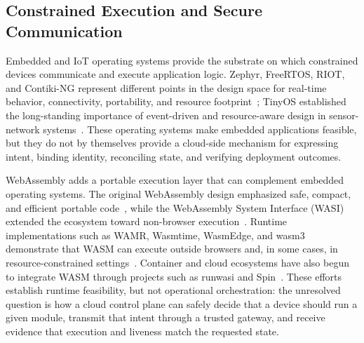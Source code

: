 
\subsection{Constrained Execution and Secure Communication}
Embedded and IoT operating systems provide the substrate on which constrained devices communicate and execute application logic. Zephyr, FreeRTOS, RIOT, and Contiki-NG represent different points in the design space for real-time behavior, connectivity, portability, and resource footprint~\cite{zephyr,freertos,riot,contiki}; TinyOS established the long-standing importance of event-driven and resource-aware design in sensor-network systems~\cite{tinyos}. These operating systems make embedded applications feasible, but they do not by themselves provide a cloud-side mechanism for expressing intent, binding identity, reconciling state, and verifying deployment outcomes.

WebAssembly adds a portable execution layer that can complement embedded operating systems. The original WebAssembly design emphasized safe, compact, and efficient portable code~\cite{haas_wasm,wasm_core}, while the WebAssembly System Interface (WASI) extended the ecosystem toward non-browser execution~\cite{wasi}. Runtime implementations such as WAMR, Wasmtime, WasmEdge, and wasm3 demonstrate that WASM can execute outside browsers and, in some cases, in resource-constrained settings~\cite{wamr,wasmtime,wasmedge,wasm3}. Container and cloud ecosystems have also begun to integrate WASM through projects such as runwasi and Spin~\cite{runwasi,spin}. These efforts establish runtime feasibility, but not operational orchestration: the unresolved question is how a cloud control plane can safely decide that a device should run a given module, transmit that intent through a trusted gateway, and receive evidence that execution and liveness match the requested state.

